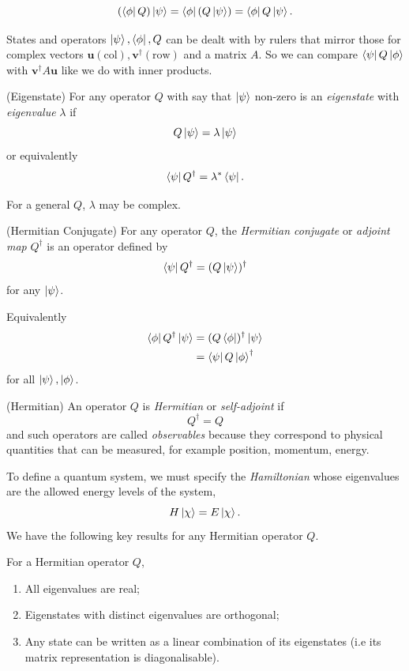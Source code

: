 \documentclass{article}
\begin{document}
\[
    \left(\bra{\phi}Q\right)\ket{\psi}
    =
    \bra{\phi}\left(Q\ket{\psi}\right)
    =
    \bra{\phi}Q\ket{\psi}.
\]
\begin{remark}
	States and operators $ \ket \psi, \bra \phi, Q $ can be dealt with by rulers that mirror those for complex vectors $ \mathbf u (\text{col}), \mathbf v^\dagger(\text{row}) $ and a matrix $ A $. So we can compare $ \bra \psi Q \ket \phi $ with $ \mathbf{v}^\dagger A\mathbf u $ like we do with inner products.
\end{remark}
\begin{definition}
	(Eigenstate) For any operator $ Q $ with say that $ \ket \psi $ non-zero is an \textit{eigenstate} with \textit{eigenvalue} $ \lambda $ if 
	\[
	  Q\ket \psi = \lambda \ket \psi
	\]
	or equivalently
	\[
	  \bra \psi Q^\dagger = \lambda^*\bra \psi.
	\]
\end{definition}
\begin{remark}
  For a general $ Q $, $ \lambda $ may be complex.
\end{remark}
\begin{definition}
	(Hermitian Conjugate) For any operator $ Q $, the \textit{Hermitian conjugate} or \textit{adjoint map} $ Q^\dagger $ is an operator defined by
	\[
	  \bra \psi Q^\dagger = (Q\ket \psi)^\dagger
	\]
	for any $ \ket \psi $.
\end{definition}
Equivalently
\begin{align*}
	\bra \phi Q^\dagger \ket \psi &= (Q\bra \phi)^\dagger \ket \psi \\
				      &= \bra \psi Q \ket \phi^\dagger
\end{align*}
for all $ \ket\psi,\ket \phi $.
\par
\begin{definition}
	(Hermitian) An operator $ Q $ is \textit{Hermitian} or \textit{self-adjoint} if
	\[
		Q^\dagger = Q
	\]
	and such operators are called \textit{observables} because they correspond to physical quantities that can be measured, for example position, momentum, energy.
\end{definition}
To define a quantum system, we must specify the \textit{Hamiltonian} whose eigenvalues are the allowed energy levels of the system,
\[
  H\ket \chi = E\ket \chi.
\]
We have the following key results for any Hermitian operator $ Q $.
\begin{proposition}
  For a Hermitian operator $ Q $,
  \begin{enumerate}
	  \item All eigenvalues are real;
	  \item Eigenstates with distinct eigenvalues are orthogonal;
	  \item Any state can be written as a linear combination of its eigenstates (i.e its matrix representation is diagonalisable).
  \end{enumerate}
\end{proposition}
\end{document}
